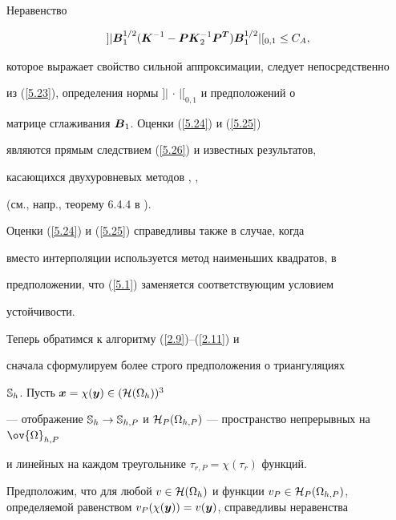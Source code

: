 \begin{pf}


Неравенство


\begin{equation}\label{5.26}


]|{\bi B}_1^ {1/2}({\bi K}^{-1}-{\bi P}{\bi K}^{-1}_2 {\bi P}^{\bi


T}){\bi B}_1^{1/2}|[{_{0,1}}\le C_A,


\end{equation}


которое выражает свойство сильной аппроксимации, следует непосредственно


из (\ref{5.23}), определения нормы $]|\, \cdot\, |[_{0,1}$ и предположений о


матрице сглаживания ${\boldsymbol B}_1$. Оценки (\ref{5.24}) и (\ref{5.25})


являются прямым следствием (\ref{5.26}) и известных результатов,


касающихся двухуровневых методов \cite{[3]}, \cite{[17]}, \cite{[27]}


(см., напр., теорему 6.4.4 в \cite{[17]}).


\end{pf}





Оценки (\ref{5.24}) и (\ref{5.25}) справедливы также в случае, когда


вместо интерполяции используется метод наименьших квадратов, в


предположении, что (\ref{5.1}) заменяется соответствующим условием


устойчивости.





Теперь обратимся к алгоритму (\ref{2.9})--(\ref{2.11}) и


сначала сформулируем более строго предположения о триангуляциях


$\Bbb{S}_h$. Пусть ${\boldsymbol x} =\chi({\boldsymbol y})\in ({\cal H}(\Omega_h))^3$


--- отображение $\Bbb{S}_h\to \Bbb{S}_{h,P}$ и ${\cal


H}_{P}(\Omega_{h,P})$ --- пространство непрерывных на $\ov{\Omega}_{h,P}$


и линейных на каждом треугольнике $\tau_{r,P}=\chi(\tau_r)$ функций.


Предположим, что для любой $v\in {\cal H}(\Omega_h)$ и функции $v_P\in


{\cal H}_{P}(\Omega_{h,P})$, определяемой равенством $v_P(\chi({\bi


y}))=v({\bi y})$, справедливы неравенства


